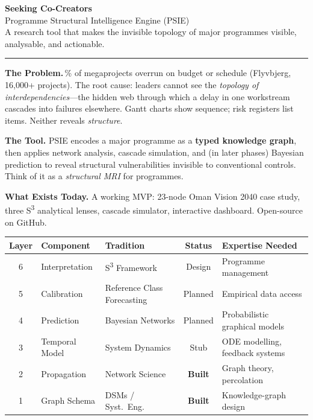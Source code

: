 \documentclass[11pt,a4paper]{article}
\begin{document}
\begin{center}
  {\LARGE\bfseries\color{oxford} Seeking Co-Creators}\\[0.4em]
  {\Large Programme Structural Intelligence Engine (PSIE)}\\[0.3em]
  {\normalsize\textcolor{muted}{A research tool that makes the invisible topology of major programmes visible, analysable, and actionable.}}
\end{center}

\vspace{0.8em}
\noindent\textcolor{oxford}{\rule{\textwidth}{0.6pt}}
\vspace{0.5em}

\noindent\textbf{\textcolor{accent}{The Problem.}}\,\% of megaprojects overrun on budget or schedule (Flyvbjerg, 16,000+ projects). The root cause: leaders cannot see the \emph{topology of interdependencies}---the hidden web through which a delay in one workstream cascades into failures elsewhere. Gantt charts show sequence; risk registers list items. Neither reveals \emph{structure}.

\noindent\textbf{\textcolor{accent}{The Tool.}}\quad
PSIE encodes a major programme as a \textbf{typed knowledge graph}, then applies network analysis, cascade simulation, and (in later phases) Bayesian prediction to reveal structural vulnerabilities invisible to conventional controls. Think of it as a \emph{structural MRI} for programmes.

\noindent\textbf{\textcolor{accent}{What Exists Today.}}\quad
A working MVP: 23-node Oman Vision 2040 case study, three S\textsuperscript{3} analytical lenses, cascade simulator, interactive dashboard. Open-source on GitHub.

\vspace{0.5em}
\begin{table}[h!]
\centering
\small
\renewcommand{\arraystretch}{1.2}
\begin{tabularx}{\textwidth}{@{}c l l c X@{}}
\toprule
\textbf{Layer} & \textbf{Component} & \textbf{Tradition} & \textbf{Status} & \textbf{Expertise Needed} \\
\midrule
6 & Interpretation & S\textsuperscript{3} Framework & Design & Programme management \\
5 & Calibration & Reference Class Forecasting & Planned & Empirical data access \\
4 & Prediction & Bayesian Networks & Planned & Probabilistic graphical models \\
3 & Temporal Model & System Dynamics & Stub & ODE modelling, feedback systems \\
\rowcolor{green!8}
2 & Propagation & Network Science & \textbf{Built} & Graph theory, percolation \\
\rowcolor{green!8}
1 & Graph Schema & DSMs / Syst.\ Eng.\ & \textbf{Built} & Knowledge-graph design \\
\bottomrule
\end{tabularx}
\end{table}
\end{document}
